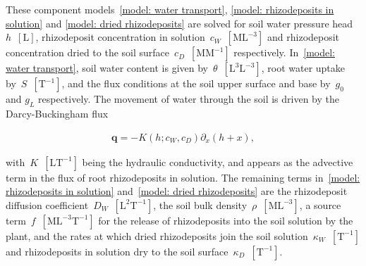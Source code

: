 \documentclass[11pt,a4paper]{article}
\numberwithin{equation}{section}
\begin{document}
These component models~\eqref{model: water transport}, \eqref{model: rhizodeposits in solution} and \eqref{model: dried rhizodeposits} are solved for soil water pressure head~$h$~$[\text{L}]$, rhizodeposit concentration in solution~$c_W$~$[\text{ML}^{-3}]$ and rhizodeposit concentration dried to  the soil surface~$c_D$~$[\text{MM}^{-1}]$ respectively. In~\eqref{model: water transport}, soil water content is given by~$\theta$~$[\text{L}^3\text{L}^{-3}]$, root water uptake by~$S$~$[\text{T}^{-1}]$, and the flux conditions at the soil upper surface and base by~$g_0$ and $g_L$ respectively. The movement of water through the soil is driven by the Darcy-Buckingham flux~\citep{darcy1856fontaines}
\begin{linenomath*}
	\begin{equation}\label{model: water flux}
		\begin{aligned}
			\mathbf{q} = - K(h; c_W, c_D)\partial_x(h + x),
		\end{aligned}
	\end{equation}
\end{linenomath*}
with~$K$~$[\text{LT}^{-1}]$ being the hydraulic conductivity, and appears as the advective term in the flux of root rhizodeposits in solution. The remaining terms in~\eqref{model: rhizodeposits in solution} and~\eqref{model: dried rhizodeposits} are the rhizodeposit diffusion coefficient~$D_W$~$[\text{L}^2\text{T}^{-1}]$, the soil bulk density~$\rho$~$[\text{ML}^{-3}]$, a source term~$f$~$[\text{ML}^{-3}\text{T}^{-1}]$ for the release of rhizodeposits into the soil solution by the plant, and the rates at which dried rhizodeposits join the soil solution~$\kappa_W$~$[\text{T}^{-1}]$ and rhizodeposits in solution dry to the soil surface~$\kappa_D$~$[\text{T}^{-1}]$.
 
\end{document}
